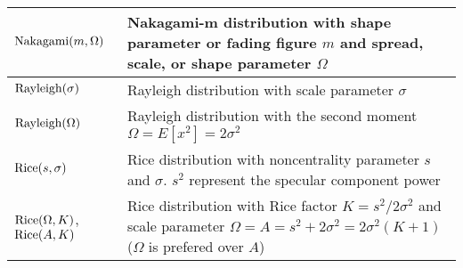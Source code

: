 \begin{xltabular}{\textwidth}{XX}
	\(\textnormal{Nakagami}(m, \Omega)\)                          & Nakagami-m distribution with shape parameter or fading figure \(m\) and spread, scale, or shape parameter \(\Omega\)                                               \\ \hline
	\(\textnormal{Rayleigh}(\sigma)\)                             & Rayleigh distribution with scale parameter \(\sigma\)                                                                                                              \\ \hline
	\(\textnormal{Rayleigh}(\Omega)\)                             & Rayleigh distribution with the second moment \(\Omega = E\left[ x^2 \right] = 2\sigma^2\)                                                                          \\ \hline
	\(\textnormal{Rice}(s, \sigma)\)                              & Rice distribution with noncentrality parameter \(s\) and \(\sigma\). \(s^2\) represent the specular component power                                                \\ \hline
	\(\textnormal{Rice}(\Omega, K)\), \(\textnormal{Rice}(A, K)\) & Rice distribution with Rice factor \(K=s^2/2\sigma^2\) and scale parameter \(\Omega = A = s^2 + 2\sigma^2 = 2\sigma^{2}(K+1)\) (\(\Omega\) is prefered over \(A\))
\end{xltabular}